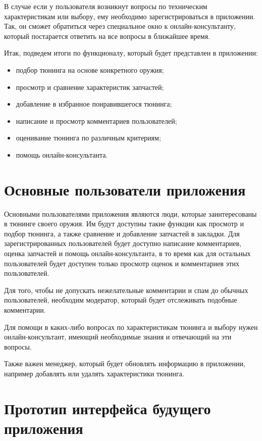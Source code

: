 \documentclass[14pt]{extreport}
\begin{document}
В случае если у пользователя возникнут вопросы по техническим характеристикам или выбору, ему необходимо зарегистрироваться в приложении. Так, он сможет обратиться через специальное окно к онлайн-консультанту, который постарается ответить на все вопросы в ближайшее время.

Итак, подведем итоги по функционалу, который будет представлен в приложении:
\begin{itemize}
\item подбор тюнинга на основе конкретного оружия;
\item просмотр и сравнение характеристик запчастей;
\item добавление в избранное понравившегося тюнинга;
\item написание и просмотр комментариев пользователей;
\item оценивание тюнинга по различным критериям;
\item помощь онлайн-консультанта.
\end{itemize}

\newpage
\section{Основные пользователи приложения}

Основными пользователями приложения являются люди, которые заинтересованы в тюнинге своего оружия. Им будут доступны такие функции как просмотр и подбор тюнинга, а также сравнение и добавление запчастей в закладки. Для зарегистрированных пользователей будет доступно написание комментариев, оценка запчастей и помощь онлайн-консультанта, в то время как для остальных пользователей будет доступен только просмотр оценок и комментариев этих пользователей.

Для того, чтобы не допускать нежелательные комментарии и спам до обычных пользователей, необходим модератор, который будет отслеживать подобные комментарии.

Для помощи в каких-либо вопросах по характеристикам тюнинга и выбору нужен онлайн-консультант, имеющий необходимые знания и отвечающий на эти вопросы.

Также важен менеджер, который будет обновлять информацию в приложении, например добавлять или удалять характеристики тюнинга.

\newpage
\section{Прототип интерфейса будущего приложения}
\end{document}
